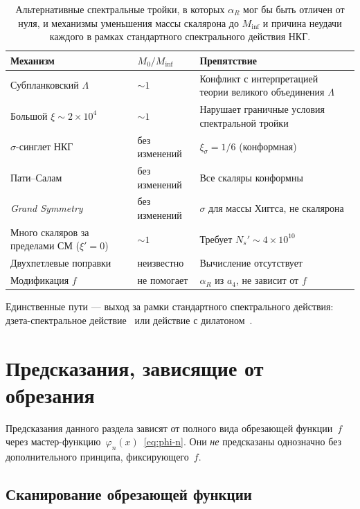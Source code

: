 \documentclass[12pt,a4paper]{article}
\theoremstyle{plain}
\theoremstyle{definition}
\theoremstyle{remark}
\begin{document}
\begin{table}[ht]
\centering
\caption{Альтернативные спектральные тройки, в которых
$\alpha_R$ мог бы быть отличен от нуля, и механизмы
уменьшения массы скалярона до
$M_{\mathrm{inf}}$ и причина неудачи каждого в рамках стандартного
спектрального действия НКГ.}
\label{tab:inflation}
\begin{tabular}{p{3.5cm}p{2.5cm}p{5cm}}
\toprule
Механизм & $M_0/M_{\mathrm{inf}}$ & Препятствие \\
\midrule
Субпланковский $\Lambda$ & $\sim 1$ &
  Конфликт с интерпретацией теории великого объединения $\Lambda$ \\
Большой $\xi \sim 2 \times 10^4$ & $\sim 1$ &
  Нарушает граничные условия спектральной тройки \\
$\sigma$-синглет НКГ~\cite{BFS:2010} & без изменений &
  $\xi_\sigma = 1/6$ (конформная) \\
Пати--Салам~\cite{CCS:2013ps} & без изменений &
  Все скаляры конформны \\
\emph{Grand Symmetry}~\cite{CCS:2013gs} & без изменений &
  $\sigma$ для массы Хиггса, не скалярона \\
Много скаляров за пределами СМ ($\xi' = 0$) & $\sim 1$ &
  Требует $N_s' \sim 4 \times 10^{10}$ \\
Двухпетлевые поправки & неизвестно &
  Вычисление отсутствует \\
Модификация $f$ & не помогает &
  $\alpha_R$ из $a_4$, не зависит от $f$ \\
\bottomrule
\end{tabular}
\end{table}

Единственные пути --- выход за рамки стандартного спектрального
действия: дзета-спектральное действие~\cite{KLV:2015} или
действие с дилатоном~\cite{CC:2006dilaton}.

\section{Предсказания, зависящие от обрезания}
\label{sec:fragile}

Предсказания данного раздела зависят от полного вида обрезающей
функции~$f$ через мастер-функцию~$\varphi_n(x)$~\eqref{eq:phi-n}.
Они \emph{не} предсказаны однозначно без дополнительного принципа,
фиксирующего~$f$.

\subsection{Сканирование обрезающей функции}
\label{sec:bands}
\end{document}
